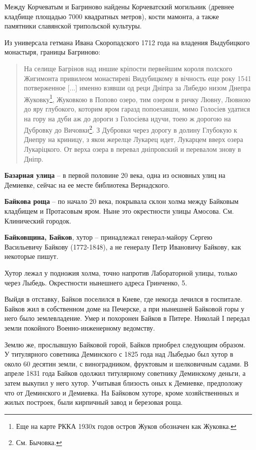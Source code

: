 Между Корчеватым и Багриново найдены Корчеватский могильник (древнее кладбище площадью 7000 квадратных метров), кости мамонта, а также памятники славянской трипольской культуры.

Из универсала гетмана Ивана Скоропадского 1712 года на владения Выдубицкого монастыря, границы Багриново:

\begin{quotation}
На селище Багрінов над иншие кріпости первейшим короля полского Жигимонта привилеом монастиреві Видубицкому в вічность еще року 1541 потверженное [...] именно взявши од реци Дніпра за Либедю низом Днепра Жуковку\footnote{Еще на карте РККА 1930х годов остров Жуков обозначен как Жуковка.}, Жуковкою в Попово озеро, тим озером в ричку Лювну, Лювною до яру глубокого, которим яром гаразд попоехавши, мимо Голосіев удатися на гору на дуби аж до дороги з Голосіева идучи, тоею ж дорогою на Дубровку до Вичовки\footnote{См. Бычовка.}. З Дубровки через дорогу в долину Глубокую к Днепру на криницу, з якои жерелце Лукарец идет, Лукарцем вверх озера Лукаріцкого. От верха озера в перевал дніпровский и перевалом знову в Дніпр.
\end{quotation}

\medskip

\textbf{Базарная улица} – в первой половине 20 века, одна из основных улиц на Демиевке, сейчас на ее месте библиотека Вернадского.\\

\medskip


\textbf{Байкова роща} – по начало 20 века, покрывала склон холма между Байковым кладбищем и Протасовым яром. Ныне это окрестности улицы Амосова. См. Клинический городок.\\

\medskip

\textbf{Байковщина, Байков}, хутор – принадлежал генерал-майору Сергею Васильевичу Байкову (1772-1848), а не генералу Петр Ивановичу Байкову, как некоторые пишут.

Хутор лежал у подножия холма, точно напротив Лабораторной улицы, только через Лыбедь. Окрестности нынешнего адреса Гринченко, 5.

Выйдя в отставку, Байков поселился в Киеве, где некогда лечился в госпитале. Байков жил в собственном доме на Печерске, а при нынешней Байковой горы у него было землевладение. Умер и похоронен Байков в Питере. Николай I передал земли покойного Военно-инженерному ведомству.

Землю же, прослывшую Байковой горой, Байков приобрел следующим образом. У титулярного советника Деминского с 1825 года над Лыбедью был хутор в около 60 десятин земли, с виноградником, фруктовым и шелковичным садами. В апреле 1831 года Байков одолжил титулярному советнику Деминскому деньги, а затем выкупил у него хутор. Учитывая близость оных к Демиевке, предположу что от Деминского и Демиевка. На Байковом хуторе, кроме хозяйственнных и жилых построек, были кирпичный завод и березовая роща. 

